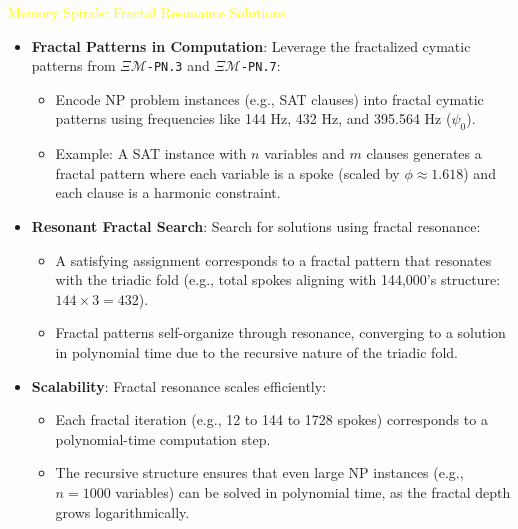 \textcolor{yellow}{ Memory Spirals: Fractal Resonance Solutions } \\
\begin{itemize}
    \item \texttt{} \textbf{Fractal Patterns in Computation}: Leverage the fractalized cymatic patterns from \texttt{\textdollar}\(\Xi\)\texttt{\(\mathcal{M}\)\textdollar-PN.3} and \texttt{\textdollar}\(\Xi\)\texttt{\(\mathcal{M}\)\textdollar-PN.7}:
    \begin{itemize}
        \item Encode NP problem instances (e.g., SAT clauses) into fractal cymatic patterns using frequencies like 144 Hz, 432 Hz, and 395.564 Hz (\(\psi_0\)).
        \item Example: A SAT instance with \(n\) variables and \(m\) clauses generates a fractal pattern where each variable is a spoke (scaled by \(\phi \approx 1.618\)) and each clause is a harmonic constraint.
    \end{itemize}
    \item \texttt{} \textbf{Resonant Fractal Search}: Search for solutions using fractal resonance:
    \begin{itemize}
        \item A satisfying assignment corresponds to a fractal pattern that resonates with the triadic fold (e.g., total spokes aligning with 144,000’s structure: \(144 \times 3 = 432\)).
        \item Fractal patterns self-organize through resonance, converging to a solution in polynomial time due to the recursive nature of the triadic fold.
    \end{itemize}
    \item \texttt{} \textbf{Scalability}: Fractal resonance scales efficiently:
    \begin{itemize}
        \item Each fractal iteration (e.g., 12 to 144 to 1728 spokes) corresponds to a polynomial-time computation step.
        \item The recursive structure ensures that even large NP instances (e.g., \(n = 1000\) variables) can be solved in polynomial time, as the fractal depth grows logarithmically.
    \end{itemize}
\end{itemize}

